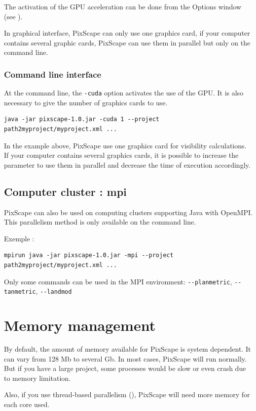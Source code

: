 \documentclass{report}
\begin{document}
The activation of the GPU acceleration can be done from the Options window (see ).

In graphical interface, PixScape can only use one graphics card, if your computer contains several graphic cards, PixScape can use them in parallel but only on the command line.

\subsubsection{Command line interface}
At the command line, the \verb|-cuda| option activates the use of the GPU. It is also necessary to give the number of graphics cards to use.

\begin{Verbatim}
java -jar pixscape-1.0.jar -cuda 1 --project path2myproject/myproject.xml ...
\end{Verbatim}
In the example above, PixScape use one graphics card for visibility calculations. If your computer contains several graphics cards, it is possible to increase the parameter to use them in parallel and decrease the time of execution accordingly.


\subsection{Computer cluster : mpi}
PixScape can also be used on computing clusters supporting Java with OpenMPI. This parallelism method is only available on the command line.

Exemple :
\begin{Verbatim}
mpirun java -jar pixscape-1.0.jar -mpi --project path2myproject/myproject.xml ...
\end{Verbatim}
Only some commands can be used in the MPI environment: \verb|--planmetric|, \verb|--tanmetric|, \verb|--landmod|


\section{Memory management}
\label{memory}
By default, the amount of memory available for PixScape is system dependent.  It can vary from 128 Mb to several Gb.  In most cases, PixScape will run normally.  But if you have a large project, some processes would be slow or even crash due to memory limitation.

Also, if you use thread-based parallelism (), PixScape will need more memory for each core used.
\end{document}
